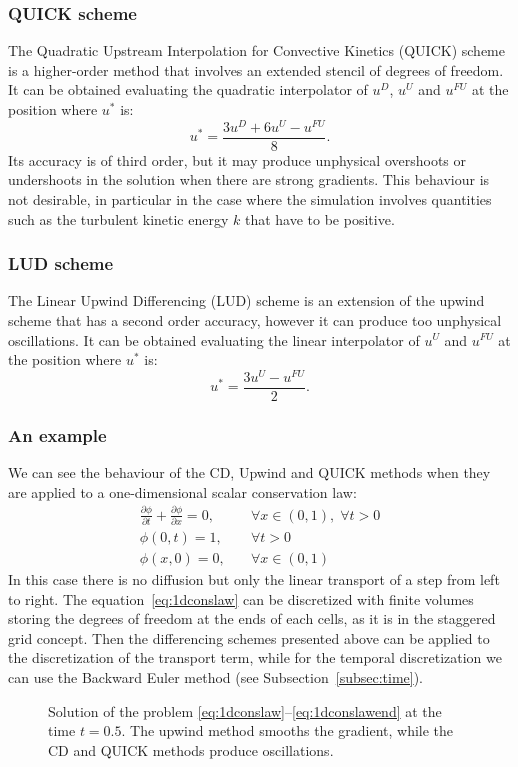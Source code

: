\subsubsection{QUICK scheme}
The Quadratic Upstream Interpolation for Convective Kinetics (QUICK) scheme 
\cite{fv:leonard} is a higher-order method that involves an extended stencil 
of degrees of freedom. It can be obtained evaluating the quadratic interpolator 
of $u^D$, $u^U$ and 
$u^{FU}$ at the position where $u^*$ is:
\begin{equation} \label{eq:quick}
	u^* = \frac{3u^D + 6u^U - u^{FU}}{8}.
\end{equation}
Its accuracy is of third order, but it may produce unphysical overshoots or 
undershoots in the solution when there are strong gradients. This behaviour is 
not desirable, in particular in the case where the simulation involves 
quantities such as the turbulent kinetic energy $k$ that have to be positive. 
%
\subsubsection{LUD scheme}
The Linear Upwind Differencing (LUD) scheme is an extension of the upwind 
scheme that has a second order accuracy, however it can produce too unphysical 
oscillations. It can be obtained evaluating the linear interpolator of $u^U$ 
and 
$u^{FU}$ at the position where $u^*$ is:
\begin{equation} \label{eq:lud}
u^* = \frac{3u^U - u^{FU}}{2}.
\end{equation}
%
\subsubsection{An example}
We can see the behaviour of the CD, Upwind and QUICK methods when they are 
applied to a one-dimensional scalar conservation law:
\begin{align}
	\label{eq:1dconslaw} \frac{\partial \phi}{\partial t} + \frac{\partial 
	\phi}{\partial x} = 0, 
	\quad &\forall x \in (0, 1), \; \forall t > 0\\
	\phi(0, t) = 1, \quad &\forall t>0\\
	\label{eq:1dconslawend}\phi(x, 0) = 0, \quad &\forall x \in (0,1)
\end{align}
In this case there is no diffusion but only the linear transport of a step from 
left to right. The equation~\eqref{eq:1dconslaw} can be discretized with finite 
volumes storing the degrees of freedom at the ends of each cells, as it is in 
the staggered grid concept. Then the differencing schemes presented above can 
be applied to the discretization of the transport term, while for the temporal 
discretization we can use the Backward Euler method (see 
Subsection~\ref{subsec:time}).
\begin{figure}[t]
	\centering
	
	\caption[Solution of a one-dimensional scalar conservation law]{Solution of 
	the problem \eqref{eq:1dconslaw}--\eqref{eq:1dconslawend} at the time 
	$t=0.5$. The upwind method smooths the gradient, while the CD and QUICK 
	methods produce oscillations.}
	\label{fig:1dconslaw}
\end{figure}

